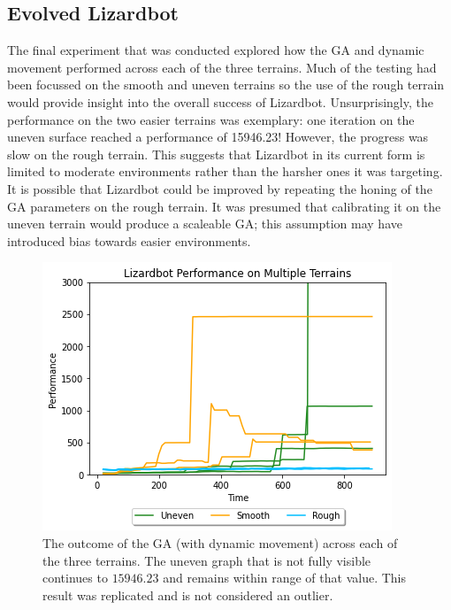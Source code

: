 \documentclass{article}
\begin{document}
\subsection{Evolved Lizardbot}
The final experiment that was conducted explored how the GA and dynamic movement performed across each of the three terrains. Much of the testing had been focussed on the smooth and uneven terrains so the use of the rough terrain would provide insight into the overall success of Lizardbot. Unsurprisingly, the performance on the two easier terrains was exemplary: one iteration on the uneven surface reached a performance of 15946.23! However, the progress was slow on the rough terrain. This suggests that Lizardbot in its current form is limited to moderate environments rather than the harsher ones it was targeting. \\
It is possible that Lizardbot could be improved by repeating the honing of the GA parameters on the rough terrain. It was presumed that calibrating it on the uneven terrain would produce a scaleable GA; this assumption may have introduced bias towards easier environments.  
\label{sec:Robot Res}
\begin{figure}[H]
\centering
\includegraphics[scale=0.8]{multipleTerrains}
\caption{The outcome of the GA (with dynamic movement) across each of the three terrains. The uneven graph that is not fully visible continues to $15946.23$ and remains within range of that value. This result was replicated and is not considered an outlier.}
\end{figure}
\end{document}

